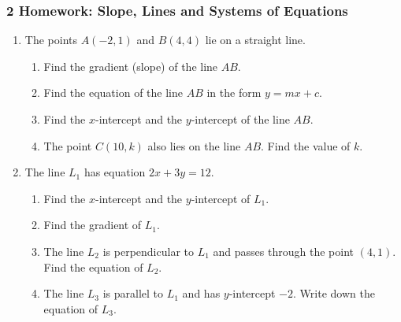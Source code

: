 \documentclass[12pt, twoside]{article}
\begin{document}
\subsubsection*{2 Homework: Slope, Lines and Systems of Equations}

\begin{enumerate}[itemsep=0.15cm]

\item[1.]
The points $A(-2, 1)$ and $B(4, 4)$ lie on a straight line.

\begin{enumerate}[itemsep=0.1cm]
  \item Find the gradient (slope) of the line $AB$.
  \item Find the equation of the line $AB$ in the form $y = mx + c$.
  \item Find the $x$-intercept and the $y$-intercept of the line $AB$.
  \item The point $C(10, k)$ also lies on the line $AB$. Find the value of $k$.
\end{enumerate}


\item[2.]
The line $L_{1}$ has equation $2x + 3y = 12$.

\begin{enumerate}[itemsep=0.1cm]
  \item Find the $x$-intercept and the $y$-intercept of $L_{1}$.
  \item Find the gradient of $L_{1}$.
  \item The line $L_{2}$ is perpendicular to $L_{1}$ and passes through the
  point $(4, 1)$. Find the equation of $L_{2}$.
  \item The line $L_{3}$ is parallel to $L_{1}$ and has $y$-intercept $-2$.
  Write down the equation of $L_{3}$.
\end{enumerate}



\end{enumerate}
\end{document}
